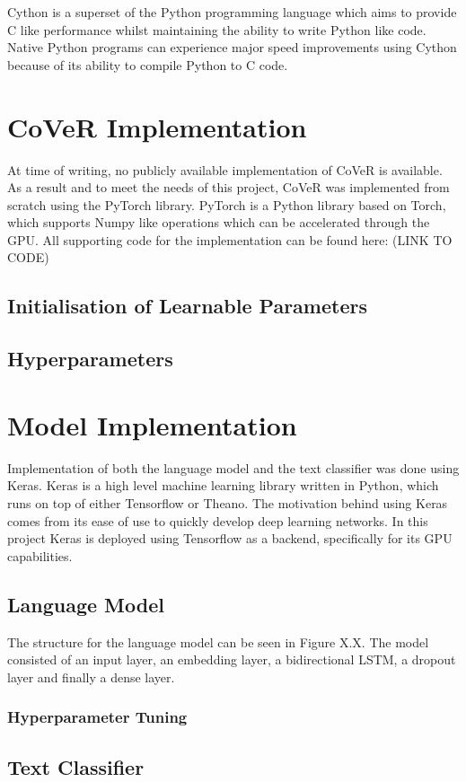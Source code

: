 \noindent
\newline
Cython is a superset of the Python programming language which aims to provide C like performance whilst maintaining the ability to write Python like code. Native Python programs can experience major speed improvements using Cython because of its ability to compile Python to C code. 

\section{CoVeR Implementation}
At time of writing, no publicly available implementation of CoVeR is available. As a result and to meet the needs of this project, CoVeR was implemented from scratch using the PyTorch library. PyTorch is a Python library based on Torch, which supports Numpy like operations which can be accelerated through the GPU. All supporting code for the implementation can be found here: (LINK TO CODE)
\subsection{Initialisation of Learnable Parameters} 
\subsection{Hyperparameters}

\section{Model Implementation}
Implementation of both the language model and the text classifier was done using Keras. Keras is a high level machine learning library written in Python, which runs on top of either Tensorflow or Theano. The motivation behind using Keras comes from its ease of use to quickly develop deep learning networks. In this project Keras is deployed using Tensorflow as a backend, specifically for its GPU capabilities.
\subsection{Language Model}
The structure for the language model can be seen in Figure X.X. The model consisted of an input layer, an embedding layer, a bidirectional LSTM, a dropout layer and finally a dense layer.
\subsubsection{Hyperparameter Tuning}
\subsection{Text Classifier}
